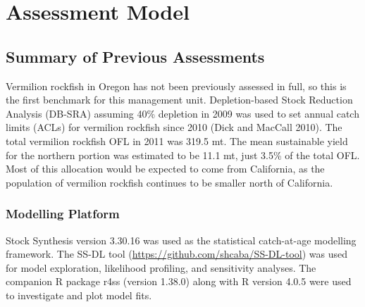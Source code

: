 \documentclass[11pt,
  english,
  a4paper,
]{article}
\begin{document}
\leavevmode\tagmcend\tagstructend\par


\hypertarget{assessment-model}{%
\section{Assessment Model}\label{assessment-model}}

\leavevmode\tagmcend\tagstructend


\hypertarget{summary-of-previous-assessments}{%
\subsection{Summary of Previous Assessments}\label{summary-of-previous-assessments}}

\leavevmode\tagmcend\tagstructend


Vermilion rockfish in Oregon has not been previously assessed in full, so this is the first benchmark for this management unit. Depletion-based Stock Reduction Analysis (DB-SRA) assuming 40\% depletion in 2009 was used to set annual catch limits (ACLs) for vermilion rockfish since 2010 {(Dick and MacCall 2010)\leavevmode\tagmcend\tagstructend}. The total vermilion rockfish OFL in 2011 was 319.5 mt. The mean sustainable yield for the northern portion was estimated to be 11.1 mt, just 3.5\% of the total OFL. Most of this allocation would be expected to come from California, as the population of vermilion rockfish continues to be smaller north of California.

\leavevmode\tagmcend\tagstructend\par


\hypertarget{modelling-platform}{%
\subsubsection{Modelling Platform}\label{modelling-platform}}

\leavevmode\tagmcend\tagstructend


Stock Synthesis version 3.30.16 was used as the statistical catch-at-age modelling framework. The SS-DL tool ({\url{https://github.com/shcaba/SS-DL-tool}\leavevmode\tagmcend\tagstructend}) was used for model exploration, likelihood profiling, and sensitivity analyses. The companion R package r4ss (version 1.38.0) along with R version 4.0.5 were used to investigate and plot model fits.
\end{document}
